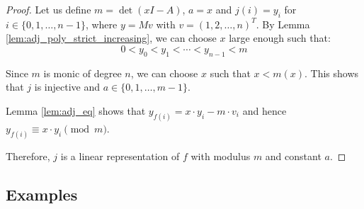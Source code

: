 \begin{proof}
Let us define $m = \det(x I - A)$, $a = x$ and $j(i) = y_i$ for $i \in \{0,1,\ldots,n-1\}$, where $y = Mv$ with $v = (1,2,\ldots,n)^T$. 
By Lemma \ref{lem:adj_poly_strict_increasing}, we can choose $x$ large enough such that:
$$0 < y_0 < y_1 < \cdots < y_{n-1} < m$$

Since $m$ is monic of degree $n$, we can choose $x$ such that $x < m(x)$. This shows that $j$ is injective and $a \in \{0,1,\ldots,m-1\}$.

Lemma \ref{lem:adj_eq} shows that $y_{f(i)} = x\cdot y_i - m\cdot v_i$ and hence $y_{f(i)} \equiv x\cdot y_i \pmod{m}$.

Therefore, $j$ is a linear representation of $f$ with modulus $m$ and constant $a$.
\end{proof}

\subsection*{Examples}

